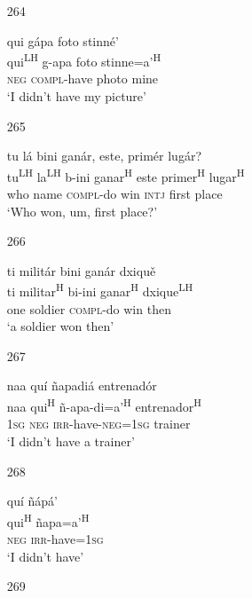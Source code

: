 \begin{itemize}
\item[264]
 
\glll   qui g\'{a}pa foto stinn\'{e}'\\
qui\textsuperscript{LH} g-apa foto stinne=a'\textsuperscript{H}\\
\textsc{neg} \textsc{compl}-have photo mine\\
\glt `I didn't have my picture'
 



\item[265]

tu l\'{a} bini gan\'{a}r, este, prim\'{e}r lug\'{a}r?\\
tu\textsuperscript{LH} la\textsuperscript{LH} b-ini ganar\textsuperscript{H} este primer\textsuperscript{H} lugar\textsuperscript{H}\\
who name \textsc{compl}-do win \textsc{intj} first place \\
\glt `Who won, um, first place?'


\item[266]

\glll ti milit\'{a}r bini gan\'{a}r dxiqu\v{e}\\
ti militar\textsuperscript{H} bi-ini ganar\textsuperscript{H} dxique\textsuperscript{LH}\\
one soldier \textsc{compl}-do win then\\
\glt `a soldier won then' 




\item[267]
 
\glll   naa qu\'{i} \~{n}apadi\'{a} entrenad\'{o}r\\
naa qui\textsuperscript{H} \~{n}-apa-di=a'\textsuperscript{H} entrenador\textsuperscript{H}\\
\textsc{1sg} \textsc{neg} \textsc{irr}-have-\textsc{neg}=\textsc{1sg} trainer\\
\glt `I didn't have a trainer'
 


\item[268]
 
\glll   qu\'{i} \~{n}\'{a}p\'{a}'\\
qui\textsuperscript{H} \~{n}apa=a'\textsuperscript{H}\\
\textsc{neg} \textsc{irr}-have=\textsc{1sg}\\
\glt `I didn't have'
 


\item[269]
 

\end{itemize}
